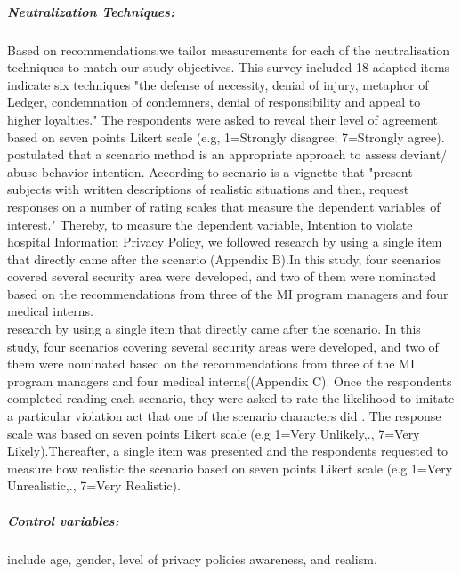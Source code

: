 \subparagraph{Neutralization Techniques:} Based on \cite{Siponen2010,Thurman1984} recommendations,we tailor measurements for each of the neutralisation techniques to match our study objectives. This survey included 18 adapted items indicate six techniques "the defense of necessity, denial of injury, metaphor of Ledger, condemnation of condemners, denial of responsibility and appeal to higher loyalties." The respondents were asked to reveal their level of agreement based on seven points Likert scale (e.g, 1=Strongly disagree; 7=Strongly agree). \\
\citet{Siponen2010} postulated that a scenario method is an appropriate approach to assess deviant/ abuse behavior intention. According to\cite{trevino1992experimental} scenario is a vignette that "present subjects with written descriptions of realistic situations and then, request responses on a number of rating scales that measure the dependent variables of interest." Thereby, to measure the dependent variable, Intention to violate hospital Information Privacy Policy, we followed \cite{Siponen2010,Teh2015} research by using a single item that  directly came after the scenario (Appendix B).In this study, four scenarios covered several security area were developed, and two of them were nominated based on the recommendations from three of the MI program managers and four medical interns. \\
research by using a single item that directly came after the scenario. In this study, four scenarios covering several security areas were developed, and two of them were nominated based on the recommendations from three of the MI program managers and four medical interns((Appendix C).
Once the respondents completed reading each scenario, they were asked to rate the likelihood to imitate a particular violation act that one of the scenario characters did \cite{Paternoster1996,Siponen2010}. The response scale was based on seven points Likert scale (e.g 1=Very Unlikely,., 7=Very Likely).Thereafter, a single item was presented and the respondents requested to measure how realistic the scenario based on seven points Likert scale (e.g 1=Very Unrealistic,., 7=Very Realistic).

\subparagraph {Control variables: } include age, gender, level of privacy policies awareness, and realism.
 

